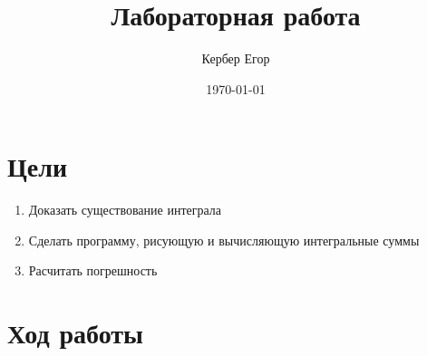 \documentclass[12pt, a4paper]{article}
\title{\textbf{Лабораторная работа}}
\author{Кербер Егор}
\date{\today}
\begin{document}
\maketitle

\tableofcontents
\section*{Цели}
\begin{enumerate}
    \item Доказать существование интеграла
    \item Сделать программу, рисующую и вычисляющую интегральные суммы
    \item Расчитать погрешность
\end{enumerate}
\section{Ход работы}
\end{document}
